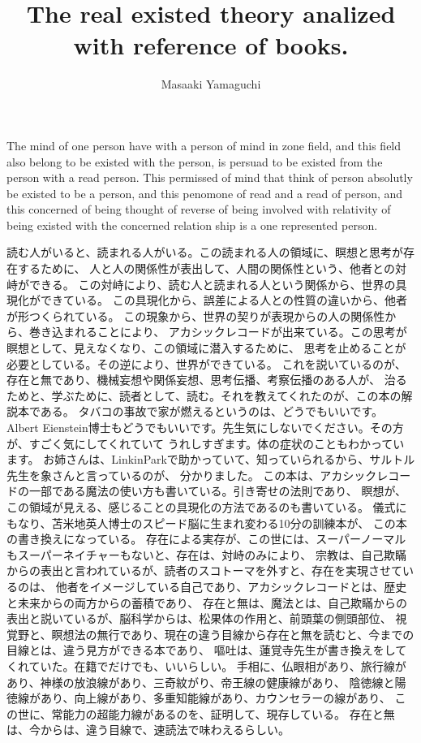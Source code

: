 \documentclass{jsarticle}
\begin{document}
\title{The real existed theory analized with reference of books.}
\author{Masaaki Yamaguchi}
\date{}
\maketitle

      The mind of one person have with a person of mind in zone field,
   and this field also belong to be existed with the person, is persuad to
   be existed from the person with a read person.
   This permissed of mind that think of person absolutly be existed to be a person,
   and this penomone of read and a read of person, and this concerned of being thought of
   reverse of being involved with relativity of being existed with the concerned relation ship
   is a one represented person.

      読む人がいると、読まれる人がいる。この読まれる人の領域に、瞑想と思考が存在するために、
   人と人の関係性が表出して、人間の関係性という、他者との対峙ができる。
   この対峙により、読む人と読まれる人という関係から、世界の具現化ができている。
   この具現化から、誤差による人との性質の違いから、他者が形つくられている。
   この現象から、世界の契りが表現からの人の関係性から、巻き込まれることにより、
   アカシックレコードが出来ている。この思考が瞑想として、見えなくなり、この領域に潜入するために、
   思考を止めることが必要としている。その逆により、世界ができている。
   これを説いているのが、存在と無であり、機械妄想や関係妄想、思考伝播、考察伝播のある人が、
   治るためと、学ぶために、読者として、読む。それを教えてくれたのが、この本の解説本である。
   タバコの事故で家が燃えるというのは、どうでもいいです。
   Albert Eienstein博士もどうでもいいです。先生気にしないでください。その方が、すごく気にしてくれていて
   うれしすぎます。体の症状のこともわかっています。
   お姉さんは、LinkinParkで助かっていて、知っていられるから、サルトル先生を象さんと言っているのが、
   分かりました。
   この本は、アカシックレコードの一部である魔法の使い方も書いている。引き寄せの法則であり、
   瞑想が、この領域が見える、感じることの具現化の方法であるのも書いている。
   儀式にもなり、苫米地英人博士のスピード脳に生まれ変わる10分の訓練本が、
   この本の書き換えになっている。
   存在による実存が、この世には、スーパーノーマルもスーパーネイチャーもないと、存在は、対峙のみにより、
   宗教は、自己欺瞞からの表出と言われているが、読者のスコトーマを外すと、存在を実現させているのは、
   他者をイメージしている自己であり、アカシックレコードとは、歴史と未来からの両方からの蓄積であり、
   存在と無は、魔法とは、自己欺瞞からの表出と説いているが、脳科学からは、松果体の作用と、前頭葉の側頭部位、
   視覚野と、瞑想法の無行であり、現在の違う目線から存在と無を読むと、今までの目線とは、違う見方ができる本であり、
   嘔吐は、蓮覚寺先生が書き換えをしてくれていた。在籍でだけでも、いいらしい。
   手相に、仏眼相があり、旅行線があり、神様の放浪線があり、三奇紋がり、帝王線の健康線があり、
   陰徳線と陽徳線があり、向上線があり、多重知能線があり、カウンセラーの線があり、
   この世に、常能力の超能力線があるのを、証明して、現存している。
   存在と無は、今からは、違う目線で、速読法で味わえるらしい。
\end{document}
